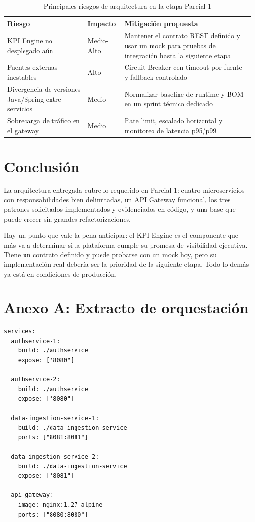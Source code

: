\documentclass[12pt,a4paper]{article}
\begin{document}
\begin{table}[H]
\centering
\begin{tabularx}{\textwidth}{p{}p{}Y}
\toprule
\textbf{Riesgo} & \textbf{Impacto} & \textbf{Mitigación propuesta} \\
\midrule
KPI Engine no desplegado aún & Medio-Alto & Mantener el contrato REST definido y usar un mock para pruebas de integración hasta la siguiente etapa \\
Fuentes externas inestables & Alto & Circuit Breaker con timeout por fuente y fallback controlado \\
Divergencia de versiones Java/Spring entre servicios & Medio & Normalizar baseline de runtime y BOM en un sprint técnico dedicado \\
Sobrecarga de tráfico en el gateway & Medio & Rate limit, escalado horizontal y monitoreo de latencia p95/p99 \\
\bottomrule
\end{tabularx}
\caption{Principales riesgos de arquitectura en la etapa Parcial 1}
\end{table}

\section{Conclusión}

La arquitectura entregada cubre lo requerido en Parcial 1: cuatro microservicios con responsabilidades bien delimitadas, un API Gateway funcional, los tres patrones solicitados implementados y evidenciados en código, y una base que puede crecer sin grandes refactorizaciones.

Hay un punto que vale la pena anticipar: el KPI Engine es el componente que más va a determinar si la plataforma cumple su promesa de visibilidad ejecutiva. Tiene un contrato definido y puede probarse con un mock hoy, pero su implementación real debería ser la prioridad de la siguiente etapa. Todo lo demás ya está en condiciones de producción.

\section*{Anexo A: Extracto de orquestación}

\begin{lstlisting}[style=yamlstyle,caption={Extracto representativo de docker-compose.yml}]
services:
  authservice-1:
    build: ./authservice
    expose: ["8080"]

  authservice-2:
    build: ./authservice
    expose: ["8080"]

  data-ingestion-service-1:
    build: ./data-ingestion-service
    ports: ["8081:8081"]

  data-ingestion-service-2:
    build: ./data-ingestion-service
    expose: ["8081"]

  api-gateway:
    image: nginx:1.27-alpine
    ports: ["8080:8080"]
\end{lstlisting}
\end{document}
